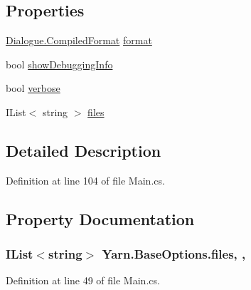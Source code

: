 \subsection*{Properties}
\begin{DoxyCompactItemize}
\item 
\hyperlink{a00092_a903f18cdcc66c28ceab5a43c41fe074d}{Dialogue.\-Compiled\-Format} \hyperlink{a00055_a9904ccfb1b0ff64df415c4fc9fe6eb1c}{format}
\item 
bool \hyperlink{a00041_a89964ea17bd19caf00cb5bff563ed01c}{show\-Debugging\-Info}
\item 
bool \hyperlink{a00041_ada4d83d1756918f362d55f6649b82b17}{verbose}
\item 
I\-List$<$ string $>$ \hyperlink{a00041_aa93cbb1bc1d5328e0a417012621e92d2}{files}
\end{DoxyCompactItemize}


\subsection{Detailed Description}


Definition at line 104 of file Main.\-cs.



\subsection{Property Documentation}
\hypertarget{a00041_aa93cbb1bc1d5328e0a417012621e92d2}{
\subsubsection[{files}]{\setlength{\rightskip}{0pt plus 5cm}I\-List$<$string$>$ Yarn.\-Base\-Options.\-files\hspace{0.3cm}{\ttfamily [get]}, {\ttfamily [set]}, {\ttfamily [inherited]}}}\label{a00041_aa93cbb1bc1d5328e0a417012621e92d2}


Definition at line 49 of file Main.\-cs.



